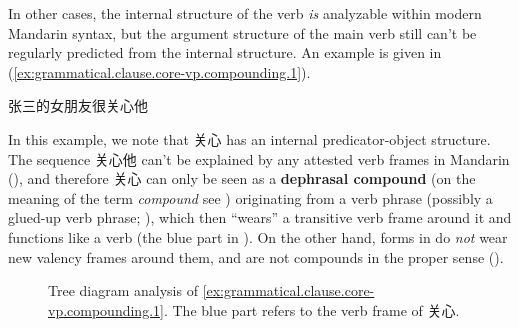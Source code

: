 \documentclass[UTF8, a4paper, oneside, scheme=plain, 12pt]{ctexrep}
\newcommand*{\concept}[1]{\textbf{#1}}
\newcommand*{\term}[1]{\emph{#1}}
\begin{document}
In other cases, the internal structure of the verb \emph{is} analyzable within modern Mandarin syntax,
but the argument structure of the main verb still can't
be regularly predicted from the internal structure.
An example is given in (\ref{ex:grammatical.clause.core-vp.compounding.1}).

\begin{exe}
    \ex\label{ex:grammatical.clause.core-vp.compounding.1} 张三的女朋友很关心他
\end{exe}

In this example, we note that 关心 has an internal predicator-object structure.
The sequence 关心他 can't be explained by any attested verb frames in Mandarin
(),
and therefore 关心 can only be seen as a \concept{dephrasal compound}
(on the meaning of the term \term{compound} see )
originating from a verb phrase
(possibly a glued-up verb phrase; ),
which then ``wears'' a transitive verb frame around it and functions like a verb
(the blue part in ).
On the other hand, forms in 
do \emph{not} wear new valency frames around them,
and are not compounds in the proper sense (). 

\begin{figure}[H]
    {
        \centering
        \small
        
    }
    \caption{Tree diagram analysis of \eqref{ex:grammatical.clause.core-vp.compounding.1}.
    The blue part refers to the verb frame of 关心.}
    \label{fig:grammatical.clause.core-vp.compounding.1}
\end{figure}
\end{document}
